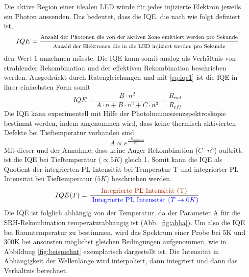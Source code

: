 \noindent
Die aktive Region einer idealen LED würde für jedes injizierte Elektron jeweils ein Photon aussenden. 
Das bedeutet, dass die IQE, die nach \cite{schub} wie folgt definiert ist,
\begin{equation}
    IQE = \frac{ \footnotesize \text{Anzahl der Photonen die von der aktiven Zone emittiert werden pro Sekunde}}{ \footnotesize \text{Anzahl der Elektronen die in die LED injiziert werden pro Sekunde}}
\end{equation}
den Wert $1$ annehmen müsste. Die IQE kann somit analog als Verhältnis von strahlender Rekombination und der effektiven Rekombination beschrieben werden. Ausgedrückt durch Ratengleichungen und mit \ref{eq:iqe1} ist die IQE in ihrer einfachsten Form somit
\begin{equation}
    IQE = \frac{B \cdot n^2}{A \cdot n + B \cdot n^2 + C \cdot n^3} = \frac{R_{rad}}{R_{eff}}
\end{equation}
Die IQE kann experimentell mit Hilfe der Photolumineszenzspektroskopie bestimmt werden, indem angenommen wird, dass keine thermisch aktivierten Defekte bei Tieftemperatur vorhanden sind
\begin{equation}
    A \propto e^{\frac{-E_{activation}}{kT}}
\end{equation}
Mit dieser und der Annahme, dass keine Auger Rekombination ($ C \cdot n^3 $) auftritt, ist die IQE bei Tieftemperatur ($ \propto 5K$) gleich 1. Somit kann die IQE als Quotient der integrierten PL Intensität bei Temperatur T und integrierter PL Intensität bei Tieftemperatur ($5K$) beschrieben werden.
\begin{equation}
    IQE(T) = \frac{\text{\textcolor[rgb]{0.65,0.16,0}{Integrierte PL Intensität (T)}}}{ \textcolor[rgb]{0,0,1}{\text{ Integrierte PL Intensität } (T \rightarrow 0 K)} }
    \label{eq:standardiqe}
\end{equation}
Die IQE ist folglich abhängig von der Temperatur, da der Parameter A für die SRH-Rekombination temperaturabhängig ist (Abb. \ref{fig:abha}). 
Um also die IQE bei Raumtemperatur zu bestimmen, wird das Spektrum einer Probe bei 5K und 300K bei ansonsten möglichst gleichen Bedingungen aufgenommen, wie in Abbildung \ref{fig:beispielint} exemplarisch dargestellt ist. Die Intensität in Abhängigkeit der Wellenlänge wird interpoliert, dann integriert und dann das Verhältnis berechnet. 
%